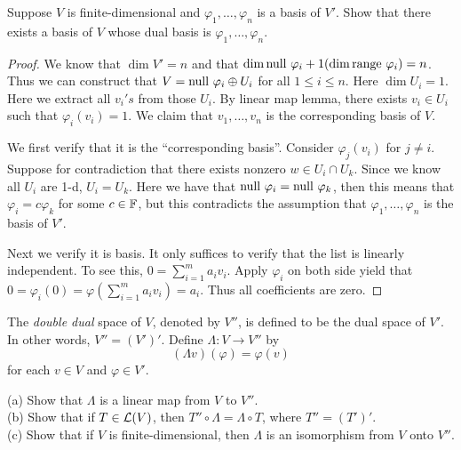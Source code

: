 \documentclass{extarticle}
\begin{document}
\begin{problem}{30}
    Suppose \(V\) is finite-dimensional and \(\varphi_1, \ldots, \varphi_n\) is a basis of \(V'\). 
    Show that there exists a basis of \(V\) whose dual basis is \(\varphi_1, \ldots, \varphi_n\).
\end{problem}

\begin{proof}
We know that \(\dim V' = n\) and that \(\dim \text{null } \varphi_i + 1 (\dim \text{range } \varphi_i) = n\). Thus 
we can construct that \(V = \text{null } \varphi_i \oplus U_i\) for all \(1 \leq i \leq n\). Here 
\(\dim U_i = 1\). Here we extract all \(v_i's\) from those \(U_i\). By linear map lemma, there exists 
\(v_i \in U_i\) such that \(\varphi_i (v_i)= 1\). We claim that \(v_1, \ldots, v_n\) is the 
corresponding basis of \(V\). 

We first verify that it is the ``corresponding basis''. Consider \(\varphi_j(v_i)\) for \(j \neq i\). 
Suppose for contradiction that there exists nonzero \(w \in U_i \cap U_k\). Since we know all 
\(U_i\) are 1-d, \(U_i = U_k\). Here we have that \(\text{null } \varphi_i = \text{null } \varphi_k\), then this 
means that \(\varphi_i = c \varphi_k\) for some \(c \in \mathbb{F}\), but this contradicts the assumption 
that \(\varphi_1, \ldots, \varphi_n\) is the basis of \(V'\). 

Next we verify it is basis. It only suffices to verify that the list is linearly independent. To 
see this, \(0 = \sum_{i=1}^{m} a_i v_i\). Apply \(\varphi_i\) on both side yield that 
\(0 = \varphi_i(0) = \varphi(\sum_{i=1}^{m} a_i v_i) = a_i\). Thus all coefficients are zero.
\end{proof}

\begin{problem}{32}
    The \emph{double dual} space of \(V\), denoted by \(V''\), is defined to be the dual space of 
    \(V'\). In other words, \(V'' = (V')'\). Define \(\Lambda \colon V \to V''\) by 
    \[(\Lambda v)(\varphi) = \varphi(v)\]
    for each \(v \in V\) and \(\varphi \in V'\).

    (a) Show that \(\Lambda\) is a linear map from \(V\) to \(V''\). \\ 
    (b) Show that if \(T \in \mathcal{L}(V)\), then \(T'' \circ \Lambda = \Lambda \circ T\), where 
    \(T'' = (T')'\). \\ 
    (c) Show that if \(V\) is finite-dimensional, then \(\Lambda\) is an isomorphism from \(V\)
    onto \(V''\). 
\end{problem}
\end{document}
